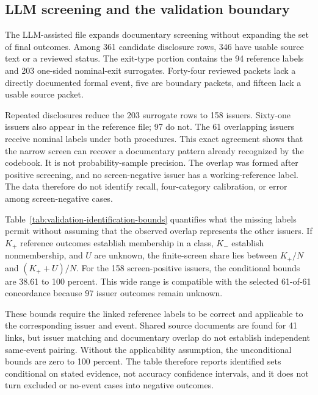 \subsection{LLM screening and the validation boundary}

The LLM-assisted file expands documentary screening without expanding the set
of final outcomes. Among 361 candidate disclosure rows, 346 have usable source
text or a reviewed status. The exit-type portion contains the 94 reference
labels and 203 one-sided nominal-exit surrogates. Forty-four reviewed packets
lack a directly documented formal event, five are boundary packets, and fifteen
lack a usable source packet.



Repeated disclosures reduce the 203 surrogate rows to 158 issuers. Sixty-one
issuers also appear in the reference file; 97 do not. The 61 overlapping
issuers receive nominal labels under both procedures. This exact agreement
shows that the narrow screen can recover a documentary pattern already
recognized by the codebook. It is not probability-sample precision. The
overlap was formed after positive screening, and no screen-negative issuer has
a working-reference label. The data therefore do not identify recall,
four-category calibration, or error among screen-negative cases.

Table~\ref{tab:validation-identification-bounds} quantifies what the missing
labels permit without assuming that the observed overlap represents the other
issuers. If $K_+$ reference outcomes establish membership in a class, $K_-$
establish nonmembership, and $U$ are unknown, the finite-screen share lies
between $K_+/N$ and $(K_++U)/N$. For the 158 screen-positive issuers, the
conditional bounds are 38.61 to 100 percent. This wide range is compatible
with the selected 61-of-61 concordance because 97 issuer outcomes remain
unknown.

These bounds require the linked reference labels to be correct and applicable
to the corresponding issuer and event. Shared source documents are found for
41 links, but issuer matching and documentary overlap do not establish
independent same-event pairing. Without the applicability assumption, the
unconditional bounds are zero to 100 percent. The table therefore reports
identified sets conditional on stated evidence, not accuracy confidence
intervals, and it does not turn excluded or no-event cases into negative
outcomes.



